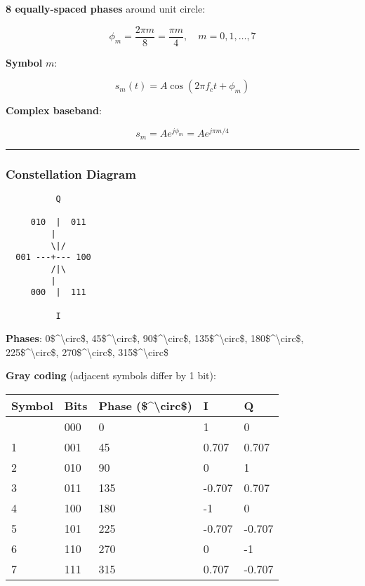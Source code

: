 \textbf{8 equally-spaced phases} around unit circle:

\[
\phi_m = \frac{2\pi m}{8} = \frac{\pi m}{4}, \quad m = 0, 1, \ldots, 7
\]

\textbf{Symbol} \(m\):

\[
s_m(t) = A\cos(2\pi f_c t + \phi_m)
\]

\textbf{Complex baseband}:

\[
s_m = A e^{j\phi_m} = A e^{j\pi m/4}
\]

\begin{center}\rule{0.5\linewidth}{0.5pt}\end{center}

\subsubsection{Constellation Diagram}\label{constellation-diagram}

\begin{verbatim}
          Q
          
     010  |  011
         |  
         \|/
  001 ---+--- 100
         /|\
         |  
     000  |  111
          
          I
\end{verbatim}

\textbf{Phases}: 0\$\^{}\textbackslash circ\$,
45\$\^{}\textbackslash circ\$, 90\$\^{}\textbackslash circ\$,
135\$\^{}\textbackslash circ\$, 180\$\^{}\textbackslash circ\$,
225\$\^{}\textbackslash circ\$, 270\$\^{}\textbackslash circ\$,
315\$\^{}\textbackslash circ\$

\textbf{Gray coding} (adjacent symbols differ by 1 bit):

{\def\LTcaptype{} %
\begin{longtable}[]{@{}lllll@{}}
\toprule\noalign{}
Symbol & Bits & Phase (\$\^{}\textbackslash circ\$) & I & Q \\
\midrule\noalign{}
\endhead
\bottomrule\noalign{}
\endlastfoot
0 & 000 & 0 & 1 & 0 \\
1 & 001 & 45 & 0.707 & 0.707 \\
2 & 010 & 90 & 0 & 1 \\
3 & 011 & 135 & -0.707 & 0.707 \\
4 & 100 & 180 & -1 & 0 \\
5 & 101 & 225 & -0.707 & -0.707 \\
6 & 110 & 270 & 0 & -1 \\
7 & 111 & 315 & 0.707 & -0.707 \\
\end{longtable}
}

